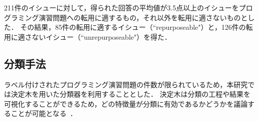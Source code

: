 
211件のイシューに対して，得られた回答の平均値が3.5点以上のイシューをプログラミング演習問題への転用に適するもの，それ以外を転用に適さないものとした．
その結果，85件の転用に適するイシュー（``repurposeable"）と，126件の転用に適さないイシュー（``unrepurposeable"）を得た．


\subsection{分類手法}
% 
ラベル付けされたプログラミング演習問題の件数が限られているため，本研究では決定木を用いた分類器を利用することとした．
決定木は分類の工程や結果を可視化することができるため，どの特徴量が分類に有効であるかどうかを議論することが可能となる~\cite{FRIEDL1997399}．


